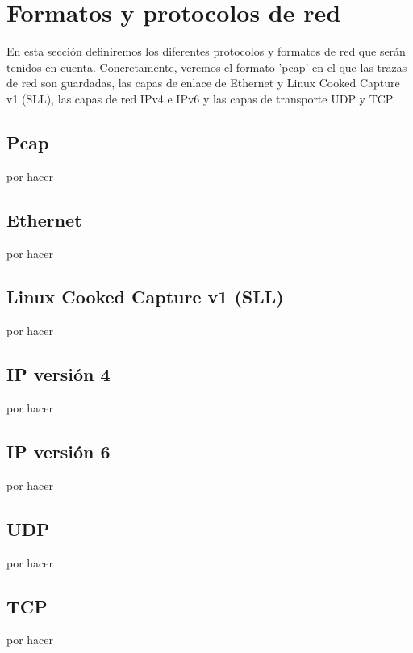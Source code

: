 \section{Formatos y protocolos de red}

En esta sección definiremos los diferentes protocolos y formatos de red que serán tenidos en cuenta. Concretamente, veremos el formato 'pcap' en el que las trazas de red son guardadas, las capas de enlace de Ethernet y Linux Cooked Capture v1 (SLL), las capas de red IPv4 e IPv6 y las capas de transporte UDP y TCP.

\subsection{Pcap}

por hacer

\subsection{Ethernet}

por hacer

\subsection{Linux Cooked Capture v1 (SLL)}

por hacer

\subsection{IP versión 4}

por hacer

\subsection{IP versión 6}

por hacer

\subsection{UDP}

por hacer

\subsection{TCP}

por hacer
